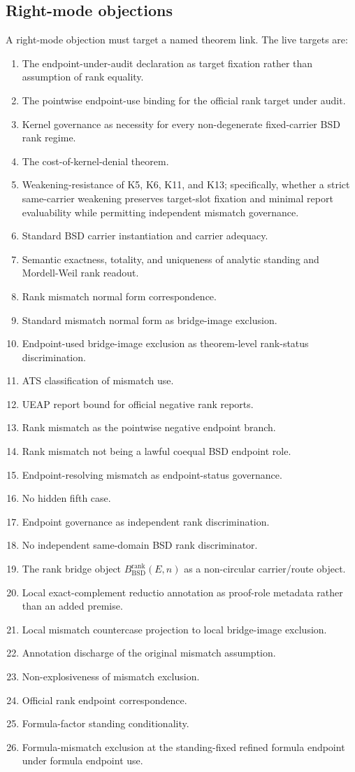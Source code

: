 \documentclass[11pt]{article}
\newcommand{\BSD}{\mathrm{BSD}}
\newcommand{\BsdRankBridge}{B^{\mathrm{rank}}_{\BSD}}
\begin{document}
\subsection{Right-mode objections}
A right-mode objection must target a named theorem link. The live targets are:
\begin{enumerate}
\item The endpoint-under-audit declaration as target fixation rather than assumption of rank equality.
\item The pointwise endpoint-use binding for the official rank target under audit.
\item Kernel governance as necessity for every non-degenerate fixed-carrier BSD rank regime.
\item The cost-of-kernel-denial theorem.
\item Weakening-resistance of K5, K6, K11, and K13; specifically, whether a strict same-carrier weakening preserves target-slot fixation and minimal report evaluability while permitting independent mismatch governance.
\item Standard BSD carrier instantiation and carrier adequacy.
\item Semantic exactness, totality, and uniqueness of analytic standing and Mordell-Weil rank readout.
\item Rank mismatch normal form correspondence.
\item Standard mismatch normal form as bridge-image exclusion.
\item Endpoint-used bridge-image exclusion as theorem-level rank-status discrimination.
\item ATS classification of mismatch use.
\item UEAP report bound for official negative rank reports.
\item Rank mismatch as the pointwise negative endpoint branch.
\item Rank mismatch not being a lawful coequal BSD endpoint role.
\item Endpoint-resolving mismatch as endpoint-status governance.
\item No hidden fifth case.
\item Endpoint governance as independent rank discrimination.
\item No independent same-domain BSD rank discriminator.
\item The rank bridge object $\BsdRankBridge(E,n)$ as a non-circular carrier/route object.
\item Local exact-complement reductio annotation as proof-role metadata rather than an added premise.
\item Local mismatch countercase projection to local bridge-image exclusion.
\item Annotation discharge of the original mismatch assumption.
\item Non-explosiveness of mismatch exclusion.
\item Official rank endpoint correspondence.
\item Formula-factor standing conditionality.
\item Formula-mismatch exclusion at the standing-fixed refined formula endpoint under formula endpoint use.
\end{enumerate}
\end{document}

